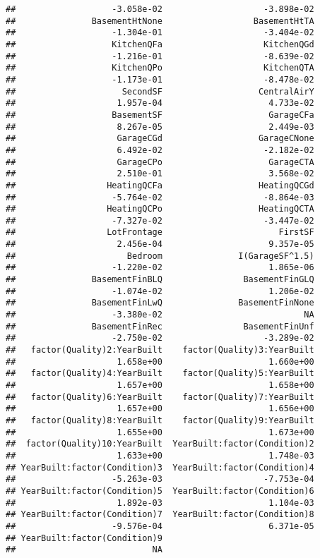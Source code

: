 \documentclass[
]{article}
\begin{document}
\begin{verbatim}
##                   -3.058e-02                    -3.898e-02  
##               BasementHtNone                  BasementHtTA  
##                   -1.304e-01                    -3.404e-02  
##                   KitchenQFa                    KitchenQGd  
##                   -1.216e-01                    -8.639e-02  
##                   KitchenQPo                    KitchenQTA  
##                   -1.173e-01                    -8.478e-02  
##                     SecondSF                   CentralAirY  
##                    1.957e-04                     4.733e-02  
##                   BasementSF                     GarageCFa  
##                    8.267e-05                     2.449e-03  
##                    GarageCGd                   GarageCNone  
##                    6.492e-02                    -2.182e-02  
##                    GarageCPo                     GarageCTA  
##                    2.510e-01                     3.568e-02  
##                  HeatingQCFa                   HeatingQCGd  
##                   -5.764e-02                    -8.864e-03  
##                  HeatingQCPo                   HeatingQCTA  
##                   -7.327e-02                    -3.447e-02  
##                  LotFrontage                       FirstSF  
##                    2.456e-04                     9.357e-05  
##                      Bedroom               I(GarageSF^1.5)  
##                   -1.220e-02                     1.865e-06  
##               BasementFinBLQ                BasementFinGLQ  
##                   -1.074e-02                     1.206e-02  
##               BasementFinLwQ               BasementFinNone  
##                   -3.380e-02                            NA  
##               BasementFinRec                BasementFinUnf  
##                   -2.750e-02                    -3.289e-02  
##   factor(Quality)2:YearBuilt    factor(Quality)3:YearBuilt  
##                    1.658e+00                     1.660e+00  
##   factor(Quality)4:YearBuilt    factor(Quality)5:YearBuilt  
##                    1.657e+00                     1.658e+00  
##   factor(Quality)6:YearBuilt    factor(Quality)7:YearBuilt  
##                    1.657e+00                     1.656e+00  
##   factor(Quality)8:YearBuilt    factor(Quality)9:YearBuilt  
##                    1.655e+00                     1.673e+00  
##  factor(Quality)10:YearBuilt  YearBuilt:factor(Condition)2  
##                    1.633e+00                     1.748e-03  
## YearBuilt:factor(Condition)3  YearBuilt:factor(Condition)4  
##                   -5.263e-03                    -7.753e-04  
## YearBuilt:factor(Condition)5  YearBuilt:factor(Condition)6  
##                    1.892e-03                     1.104e-03  
## YearBuilt:factor(Condition)7  YearBuilt:factor(Condition)8  
##                   -9.576e-04                     6.371e-05  
## YearBuilt:factor(Condition)9  
##                           NA
\end{verbatim}
\end{document}
